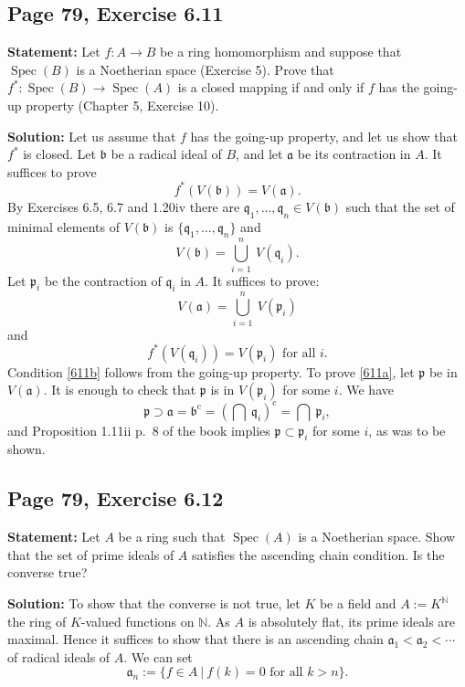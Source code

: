 \documentclass[parskip=half,fontsize=12pt]{scrartcl}%
\newcommand{\oo}{\operatorname}\newcommand{\ooo}{\operatorname*}
\newcommand{\mf}{\mathfrak}
\newcommand{\aaa}{\mf a}
\newcommand{\bbb}{\mf b}
\newcommand{\ppp}{\mf p}
\newcommand{\qqq}{\mf q}
\newcommand{\Spec}{\operatorname{Spec}}\newcommand{\Sp}{\operatorname{Spec}}
\begin{document}
\subsection{Page 79, Exercise 6.11}%

\textbf{Statement:} Let $f:A\to B$ be a ring homomorphism and suppose that $\Spec(B)$ is a Noetherian space (Exercise 5). Prove that $f^*:\Spec(B)\to\Spec(A)$ is a closed mapping if and only if $f$ has the going-up property (Chapter 5, Exercise 10).

\textbf{Solution:} Let us assume that $f$ has the going-up property, and let us show that $f^*$ is closed. Let $\bbb$ be a radical ideal of $B$, and let $\aaa$ be its contraction in $A$. It suffices to prove 
$$
f^*(V(\bbb))=V(\aaa).
$$ 
By Exercises 6.5, 6.7 and 1.20iv there are $\qqq_1,\dots,\qqq_n\in V(\bbb)$ such that the set of minimal elements of $V(\bbb)$ is $\{\qqq_1,\dots,\qqq_n\}$ and 
$$
V(\bbb)=\bigcup_{i=1}^n\ V(\qqq_i).
$$ 
Let $\ppp_i$ be the contraction of $\qqq_i$ in $A$. It suffices to prove: 
\begin{equation}\label{611a}
V(\aaa)=\bigcup_{i=1}^n\ V(\ppp_i)
\end{equation} 
and 
\begin{equation}\label{611b}
f^*(V(\qqq_i))=V(\ppp_i)\text{ for all }i.
\end{equation} 
Condition \eqref{611b} follows from the going-up property. To prove \eqref{611a}, let $\ppp$ be in $V(\aaa)$. It is enough to check that $\ppp$ is in $V(\ppp_i)$ for some $i$. We have 
$$
\ppp\supset\aaa=\bbb^{\oo c}=\left(\bigcap\ \qqq_i\right)^{\oo c}=\bigcap\ \ppp_i,
$$ 
and Proposition 1.11ii p.~8 of the book implies $\ppp\subset\ppp_i$ for some $i$, as was to be shown. 

\subsection{Page 79, Exercise 6.12}%

\textbf{Statement:} Let $A$ be a ring such that $\Spec(A)$ is a Noetherian space. Show that the set of prime ideals of $A$ satisfies the ascending chain condition. Is the converse true?

\textbf{Solution:} To show that the converse is not true, let $K$ be a field and $A:=K^{\mathbb N}$ the ring of $K$-valued functions on $\mathbb N$. As $A$ is absolutely flat, its prime ideals are maximal. Hence it suffices to show that there is an ascending chain $\aaa_1<\aaa_2<\cdots$ of radical ideals of $A$. We can set 
$$
\aaa_n:=\{f\in A\ |\ f(k)=0\text{ for all }k>n\}.
$$
\end{document}
